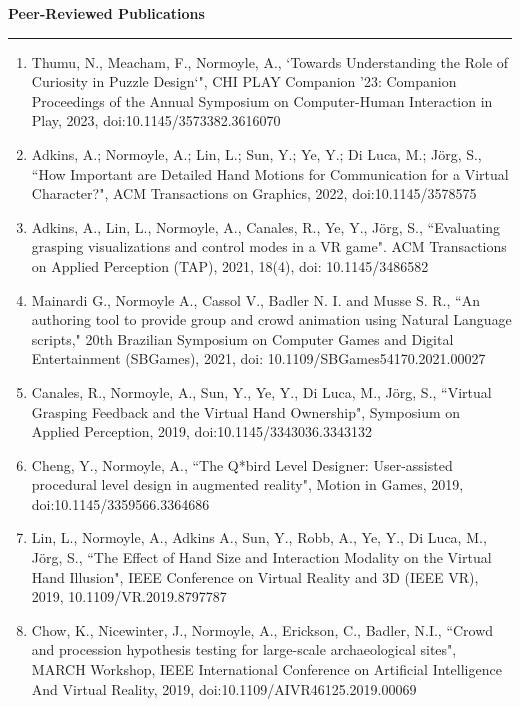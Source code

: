 {\Large {\bf  Peer-Reviewed Publications}}
\vspace{0.1cm}
\hrule
\medskip

\begin{enumerate}[leftmargin=*]

\item Thumu, N., Meacham, F., Normoyle, A., `Towards Understanding the Role of Curiosity in Puzzle Design`", CHI PLAY Companion '23: Companion Proceedings of the Annual Symposium on Computer-Human Interaction in Play, 2023, doi:10.1145/3573382.3616070

\item Adkins, A.; Normoyle, A.; Lin, L.; Sun, Y.; Ye, Y.; Di Luca, M.; J\"{o}rg, S., ``How Important are Detailed Hand Motions for Communication for a Virtual Character?", ACM Transactions on Graphics, 2022, doi:10.1145/3578575

\item Adkins, A., Lin, L., Normoyle, A., Canales, R., Ye, Y., J\"{o}rg, S., ``Evaluating grasping visualizations and control modes in a VR game". ACM Transactions on Applied Perception (TAP), 2021, 18(4), doi: 10.1145/3486582

\item Mainardi G., Normoyle A., Cassol V., Badler N. I. and Musse S. R., ``An authoring tool to provide group and crowd animation using Natural Language scripts," 20th Brazilian Symposium on Computer Games and Digital Entertainment (SBGames), 2021, doi: 10.1109/SBGames54170.2021.00027

\item Canales, R., Normoyle, A., Sun, Y., Ye, Y., Di Luca, M., J\"{o}rg, S., ``Virtual Grasping Feedback and the Virtual Hand Ownership", Symposium on Applied Perception, 2019, doi:10.1145/3343036.3343132

\item Cheng, Y., Normoyle, A., ``The Q*bird Level Designer: User-assisted procedural level design in augmented reality", Motion in Games, 2019, doi:10.1145/3359566.3364686

\item Lin, L., Normoyle, A., Adkins A., Sun, Y., Robb, A., Ye, Y., Di Luca, M., J\"{o}rg, S., ``The Effect of Hand Size and Interaction Modality on the Virtual Hand Illusion", IEEE Conference on Virtual Reality and 3D (IEEE VR), 2019, 10.1109/VR.2019.8797787

\item Chow, K., Nicewinter, J., Normoyle, A., Erickson, C., Badler, N.I., ``Crowd and procession hypothesis testing for large-scale archaeological sites", MARCH Workshop, IEEE International Conference on Artificial Intelligence And Virtual Reality, 2019, doi:10.1109/AIVR46125.2019.00069


\end{enumerate}
